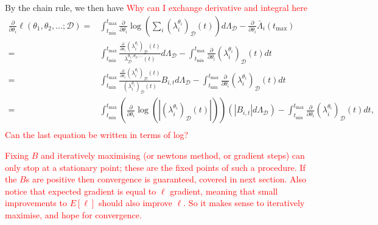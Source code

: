 \documentclass[honours,12pt]{unswthesis}
\numberwithin{equation}{section}
\begin{document}
By the chain rule, we then have
\textcolor{red}{Why can I exchange derivative and integral here}
\begin{equation*}
	\begin{align}
		\frac{\partial}{\partial \theta_i}\ell(\theta_1,\theta_2,\ldots;\mathcal{D})
		= & \int_{t_\mathrm{min}}^{t_\mathrm{max}}\frac{\partial}{\partial\theta_i}\log\left(\sum_i \left(\lambda_i^{\theta_i}\right)_\mathcal{D}(t)\right)d\Lambda_\mathcal{D} - \frac{\partial}{\partial\theta_i}\bar\Lambda_i(t_\mathrm{max})\\
		= & \int_{t_\mathrm{min}}^{t_\mathrm{max}}\frac{\frac{\partial}{\partial\theta_i}\left(\lambda_i^{\theta_i}\right)_\mathcal{D}(t)}{\lambda^{\theta_1,\theta_2,\ldots}_\mathcal{D}(t)}d\Lambda_\mathcal{D} - \int_{t_\mathrm{min}}^{t_\mathrm{max}}\frac{\partial}{\partial\theta_i}\left(\lambda_i^{\theta_i}\right)_\mathcal{D}(t)dt\\
		= & \int_{t_\mathrm{min}}^{t_\mathrm{max}}\frac{\frac{\partial}{\partial\theta_i}\left(\lambda_i^{\theta_i}\right)_\mathcal{D}(t)}{\left(\lambda_i^{\theta_i}\right)_\mathcal{D}(t)}B_{i,t}d\Lambda_\mathcal{D} - \int_{t_\mathrm{min}}^{t_\mathrm{max}}\frac{\partial}{\partial\theta_i}\left(\lambda_i^{\theta_i}\right)_\mathcal{D}(t)dt\\
		= & \int_{t_\mathrm{min}}^{t_\mathrm{max}} \left(\frac{\partial}{\partial\theta_i}\log\left(\left\vert\left(\lambda_i^{\theta_i}\right)_\mathcal{D}(t)\right\vert\right)\right) \left(\left\vert B_{i,t}\right\vert d\Lambda_\mathcal{D}\right) - \int_{t_\mathrm{min}}^{t_\mathrm{max}}\frac{\partial}{\partial\theta_i}\left(\lambda_i^{\theta_i}\right)_\mathcal{D}(t)dt,\\
	\end{align}
\end{equation*}
\textcolor{red}{Can the last equation be written in terms of log?}

\textcolor{red}{Fixing $B$ and iteratively maximising (or newtons method, or gradient steps) can only stop at a stationary point; these are the fixed points of such a procedure. If the $B$s are positive then convergence is guaranteed, covered in next section. Also notice that expected gradient is equal to $\ell$ gradient, meaning that small improvements to $E[\ell]$ should also improve $\ell$. So it makes sense to iteratively maximise, and hope for convergence.}
\end{document}
